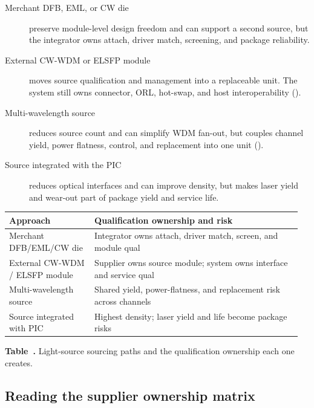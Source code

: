 \begin{description}
\item[Merchant DFB, EML, or CW die] preserve module-level design freedom and can
      support a second source, but the integrator owns attach, driver match,
      screening, and package reliability.
\item[External CW-WDM or ELSFP module] moves source qualification and management
      into a replaceable unit. The system still owns connector, ORL, hot-swap,
      and host interoperability ().
\item[Multi-wavelength source] reduces source count and can simplify WDM fan-out,
      but couples channel yield, power flatness, control, and replacement into one
      unit ().
\item[Source integrated with the PIC] reduces optical interfaces and can improve
      density, but makes laser yield and wear-out part of package yield and
      service life.
\end{description}

\begin{table}[ht]
\label{tab:laser-suppliers}%
\centering
\setlength{\tabcolsep}{5pt}%
\renewcommand{\arraystretch}{1.25}%
\begin{tabular}{@{}p{0.28\linewidth}p{0.68\linewidth}@{}}
\toprule
Approach & Qualification ownership and risk \\
\midrule
Merchant DFB/EML/CW die & Integrator owns attach, driver match, screen, and module qual \\
\addlinespace[1.5em]
External CW-WDM / ELSFP module & Supplier owns source module; system owns interface and service qual \\
\addlinespace[1.5em]
Multi-wavelength source & Shared yield, power-flatness, and replacement risk across channels \\
\addlinespace[1.5em]
Source integrated with PIC & Highest density; laser yield and life become package risks \\
\bottomrule
\end{tabular}
\par\medskip
{\raggedright\footnotesize\textbf{Table~\thetable.} Light-source sourcing paths
and the qualification ownership each one creates.\par}
\end{table}
\FloatBarrier

\subsection{Reading the supplier ownership matrix}
\label{sec:laser-suppliers-read}

